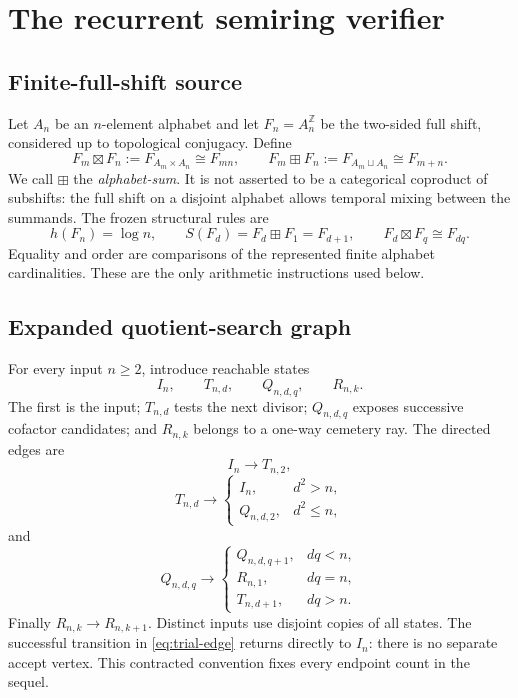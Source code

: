 \section{The recurrent semiring verifier}
\label{sec:verifier}

\subsection{Finite-full-shift source}

Let $A_n$ be an $n$-element alphabet and let
$F_n=A_n^{\mathbb Z}$ be the two-sided full shift, considered up to
topological conjugacy.  Define
\[
F_m\boxtimes F_n:=F_{A_m\times A_n}\cong F_{mn},
\qquad
F_m\boxplus F_n:=F_{A_m\sqcup A_n}\cong F_{m+n}.
\]
We call $\boxplus$ the \emph{alphabet-sum}.  It is not asserted to be a
categorical coproduct of subshifts: the full shift on a disjoint alphabet
allows temporal mixing between the summands.  The frozen structural rules are
\[
h(F_n)=\log n,
\qquad
S(F_d)=F_d\boxplus F_1=F_{d+1},
\qquad
F_d\boxtimes F_q\cong F_{dq}.
\]
Equality and order are comparisons of the represented finite alphabet
cardinalities.  These are the only arithmetic instructions used below.

\subsection{Expanded quotient-search graph}

For every input $n\ge2$, introduce reachable states
\[
I_n,\qquad T_{n,d},\qquad Q_{n,d,q},\qquad R_{n,k}.
\]
The first is the input; $T_{n,d}$ tests the next divisor; $Q_{n,d,q}$ exposes
successive cofactor candidates; and $R_{n,k}$ belongs to a one-way cemetery
ray.  The directed edges are
\begin{equation}
I_n\longrightarrow T_{n,2},
\label{eq:input-edge}
\end{equation}
\begin{equation}
T_{n,d}\longrightarrow
\begin{cases}
I_n,&d^2>n,\\
Q_{n,d,2},&d^2\le n,
\end{cases}
\label{eq:trial-edge}
\end{equation}
and
\begin{equation}
Q_{n,d,q}\longrightarrow
\begin{cases}
Q_{n,d,q+1},&dq<n,\\
R_{n,1},&dq=n,\\
T_{n,d+1},&dq>n.
\end{cases}
\label{eq:quotient-edge}
\end{equation}
Finally $R_{n,k}\to R_{n,k+1}$.  Distinct inputs use disjoint copies of all
states.  The successful transition in \eqref{eq:trial-edge} returns directly
to $I_n$: there is no separate accept vertex.  This contracted convention
fixes every endpoint count in the sequel.

